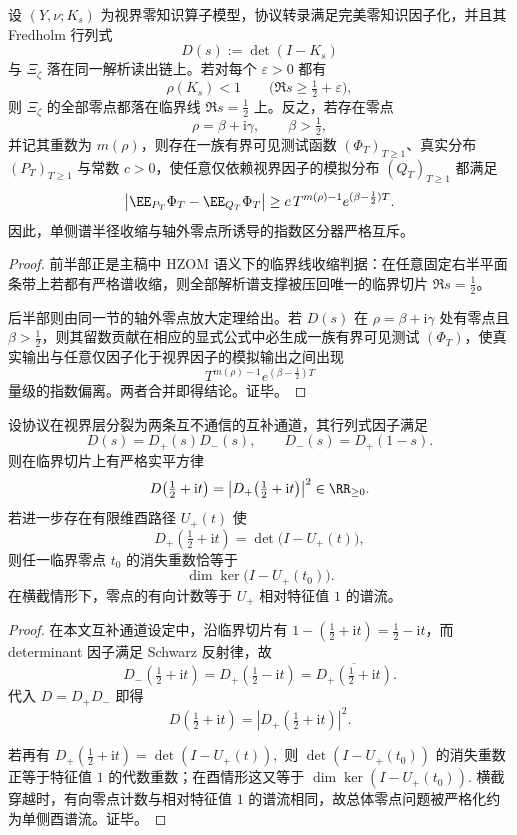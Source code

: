 \begin{theorem}[视界零知识的单侧收缩与指数区分器互斥]\label{thm:conclusion-hzom-one-sided-contraction-exponential-distinguisher-incompatibility}
设 \((Y,\nu;K_s)\) 为视界零知识算子模型，协议转录满足完美零知识因子化，并且其 Fredholm 行列式
\[
D(s):=\det(I-K_s)
\]
与 \(\Xi_\zeta\) 落在同一解析读出链上。若对每个 \(\varepsilon>0\) 都有
\[
\rho(K_s)<1
\qquad
\bigl(\Re s\ge \tfrac12+\varepsilon\bigr),
\]
则 \(\Xi_\zeta\) 的全部零点都落在临界线 \(\Re s=\tfrac12\) 上。反之，若存在零点
\[
\rho=\beta+\mathrm{i}\gamma,
\qquad
\beta>\tfrac12,
\]
并记其重数为 \(m(\rho)\)，则存在一族有界可见测试函数 \((\Phi_T)_{T\ge 1}\)、真实分布 \((P_T)_{T\ge 1}\) 与常数 \(c>0\)，使任意仅依赖视界因子的模拟分布 \((Q_T)_{T\ge 1}\) 都满足
\[
\bigl|\EE_{P_T}\Phi_T-\EE_{Q_T}\Phi_T\bigr|
\ge
c\,T^{m(\rho)-1}e^{(\beta-\frac12)T}.
\]
因此，单侧谱半径收缩与轴外零点所诱导的指数区分器严格互斥。
\end{theorem}
\begin{proof}
前半部正是主稿中 HZOM 语义下的临界线收缩判据：在任意固定右半平面条带上若都有严格谱收缩，则全部解析谱支撑被压回唯一的临界切片 \(\Re s=\tfrac12\)。

后半部则由同一节的轴外零点放大定理给出。若 \(D(s)\) 在 \(\rho=\beta+\mathrm{i}\gamma\) 处有零点且 \(\beta>\tfrac12\)，则其留数贡献在相应的显式公式中必生成一族有界可见测试 \((\Phi_T)\)，使真实输出与任意仅因子化于视界因子的模拟输出之间出现
\[
T^{m(\rho)-1}e^{(\beta-\frac12)T}
\]
量级的指数偏离。两者合并即得结论。证毕。
\end{proof}

\begin{theorem}[互补零知识通道的临界模平方与谱流化约]\label{thm:conclusion-complementary-zk-channel-critical-modsquare-spectralflow}
设协议在视界层分裂为两条互不通信的互补通道，其行列式因子满足
\[
D(s)=D_+(s)D_-(s),
\qquad
D_-(s)=D_+(1-s).
\]
则在临界切片上有严格实平方律
\[
D\!\left(\tfrac12+\mathrm{i}t\right)
=
\left|D_+\!\left(\tfrac12+\mathrm{i}t\right)\right|^2
\in \RR_{\ge 0}.
\]
若进一步存在有限维酉路径 \(U_+(t)\) 使
\[
D_+\!\left(\tfrac12+\mathrm{i}t\right)=\det\!\bigl(I-U_+(t)\bigr),
\]
则任一临界零点 \(t_0\) 的消失重数恰等于
\[
\dim\ker\!\bigl(I-U_+(t_0)\bigr).
\]
在横截情形下，零点的有向计数等于 \(U_+\) 相对特征值 \(1\) 的谱流。
\end{theorem}
\begin{proof}
在本文互补通道设定中，沿临界切片有 \(1-(\tfrac12+\mathrm{i}t)=\tfrac12-\mathrm{i}t\)，而 determinant 因子满足 Schwarz 反射律，故
\[
D_-\!\left(\tfrac12+\mathrm{i}t\right)
=
D_+\!\left(\tfrac12-\mathrm{i}t\right)
=
\overline{D_+\!\left(\tfrac12+\mathrm{i}t\right)}.
\]
代入 \(D=D_+D_-\) 即得
\[
D\!\left(\tfrac12+\mathrm{i}t\right)
=
\left|D_+\!\left(\tfrac12+\mathrm{i}t\right)\right|^2.
\]

若再有
\(
D_+(\tfrac12+\mathrm{i}t)=\det(I-U_+(t)),
\)
则 \(\det(I-U_+(t_0))\) 的消失重数正等于特征值 \(1\) 的代数重数；在酉情形这又等于
\(
\dim\ker(I-U_+(t_0)).
\)
横截穿越时，有向零点计数与相对特征值 \(1\) 的谱流相同，故总体零点问题被严格化约为单侧酉谱流。证毕。
\end{proof}

